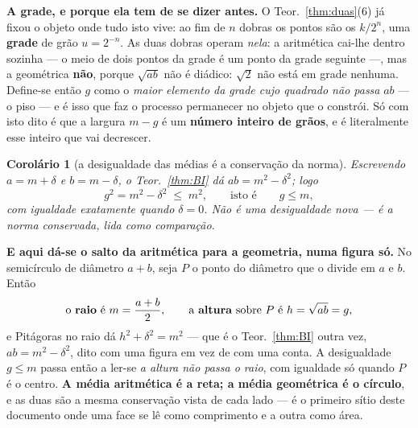 \documentclass[11pt,a4paper]{article}
\newtheorem{corolario}[teorema]{Corolário}
\begin{document}
\medskip\noindent\textbf{A grade, e porque ela tem de se dizer antes.} O
Teor.~\ref{thm:duas}(6) já fixou o objeto onde tudo isto vive: ao fim de $n$
dobras os pontos são os $k/2^{n}$, uma \textbf{grade} de grão $u=2^{-n}$. As duas
dobras operam \emph{nela}: a aritmética cai-lhe dentro sozinha --- o meio de dois
pontos da grade é um ponto da grade seguinte ---, mas a geométrica \textbf{não},
porque $\sqrt{ab}$ não é diádico: $\sqrt2$ não está em grade nenhuma. Define-se
então $g$ como o \emph{maior elemento da grade cujo quadrado não passa} $ab$ --- o
piso --- e é isso que faz o processo permanecer no objeto que o constrói. Só com
isto dito é que a largura $m-g$ é um \textbf{número inteiro de grãos}, e é
literalmente esse inteiro que vai decrescer.

\begin{corolario}[a desigualdade das médias é a conservação da norma]\label{cor:medias}
Escrevendo $a=m+\delta$ e $b=m-\delta$, o Teor.~\ref{thm:BI} dá
$ab=m^{2}-\delta^{2}$; logo
\[
g^{2}=m^{2}-\delta^{2}\;\le\;m^{2},\qquad\text{isto é}\qquad g\le m,
\]
com igualdade \emph{exatamente} quando $\delta=0$. Não é uma desigualdade nova
--- é a norma conservada, lida como comparação.
\end{corolario}

\medskip\noindent\textbf{E aqui dá-se o salto da aritmética para a geometria,
numa figura só.} No semicírculo de diâmetro $a+b$, seja $P$ o ponto do diâmetro
que o divide em $a$ e $b$. Então
\[
\text{o \textbf{raio} é }m=\frac{a+b}{2},
\qquad
\text{a \textbf{altura} sobre }P\text{ é }h=\sqrt{ab}=g,
\]
e Pitágoras no raio dá $h^{2}+\delta^{2}=m^{2}$ --- que é o Teor.~\ref{thm:BI}
outra vez, $ab=m^{2}-\delta^{2}$, dito com uma figura em vez de com uma conta. A
desigualdade $g\le m$ passa então a ler-se \emph{a altura não passa o raio}, com
igualdade só quando $P$ é o centro. \textbf{A média aritmética é a reta; a média
geométrica é o círculo}, e as duas são a mesma conservação vista de cada lado ---
é o primeiro sítio deste documento onde uma face se lê como comprimento e a
outra como área.
\end{document}
